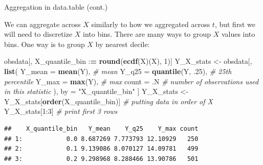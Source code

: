 \documentclass[10pt,ignorenonframetext,]{beamer}
\newenvironment{Shaded}{\begin{snugshade}}{\end{snugshade}}
\newcommand{\KeywordTok}[1]{\textcolor[rgb]{0.13,0.29,0.53}{\textbf{{#1}}}}
\newcommand{\DataTypeTok}[1]{\textcolor[rgb]{0.13,0.29,0.53}{{#1}}}
\newcommand{\DecValTok}[1]{\textcolor[rgb]{0.00,0.00,0.81}{{#1}}}
\newcommand{\StringTok}[1]{\textcolor[rgb]{0.31,0.60,0.02}{{#1}}}
\newcommand{\CommentTok}[1]{\textcolor[rgb]{0.56,0.35,0.01}{\textit{{#1}}}}
\newcommand{\ErrorTok}[1]{\textcolor[rgb]{0.64,0.00,0.00}{\textbf{{#1}}}}
\newcommand{\NormalTok}[1]{{#1}}
\begin{document}
\begin{frame}[fragile]{Aggregation in data.table (cont.)}

We can aggregate across \(X\) similarly to how we aggregated across
\(t\), but first we will need to discretize \(X\) into bins. There are
many ways to group \(X\) values into bins. One way is to group \(X\) by
nearest decile:

\footnotesize

\begin{Shaded}
\begin{Highlighting}[]
\NormalTok{obsdata[, X_quantile_bin :}\ErrorTok{=}\StringTok{ }\KeywordTok{round}\NormalTok{(}\KeywordTok{ecdf}\NormalTok{(X)(X), }\DecValTok{1}\NormalTok{)]}
\NormalTok{Y_X_stats <-}\StringTok{ }\NormalTok{obsdata[,}
  \KeywordTok{list}\NormalTok{(}
    \DataTypeTok{Y_mean =} \KeywordTok{mean}\NormalTok{(Y), }\CommentTok{# mean}
    \DataTypeTok{Y_q25 =} \KeywordTok{quantile}\NormalTok{(Y, .}\DecValTok{25}\NormalTok{), }\CommentTok{# 25th percentile}
    \DataTypeTok{Y_max =} \KeywordTok{max}\NormalTok{(Y), }\CommentTok{# max}
    \DataTypeTok{count =} \NormalTok{.N }\CommentTok{# number of observations used in this statistic}
  \NormalTok{),}
  \NormalTok{by =}\StringTok{ "X_quantile_bin"}
\NormalTok{]}
\NormalTok{Y_X_stats <-}\StringTok{ }\NormalTok{Y_X_stats[}\KeywordTok{order}\NormalTok{(X_quantile_bin)] }\CommentTok{# putting data in order of X}
\NormalTok{Y_X_stats[}\DecValTok{1}\NormalTok{:}\DecValTok{3}\NormalTok{] }\CommentTok{# print first 3 rows}
\end{Highlighting}
\end{Shaded}

\begin{verbatim}
##    X_quantile_bin   Y_mean    Y_q25    Y_max count
## 1:            0.0 8.687269 7.773793 12.10929   250
## 2:            0.1 9.139086 8.070127 14.09781   499
## 3:            0.2 9.298968 8.288466 13.90786   501
\end{verbatim}

\normalsize

\end{frame}
\end{document}
